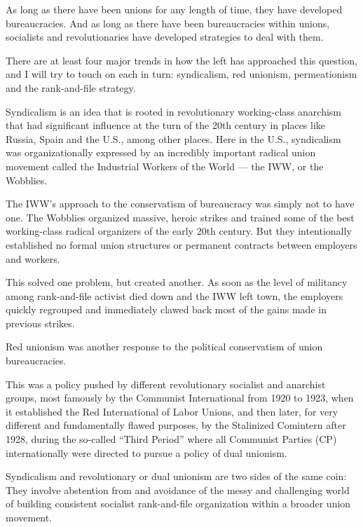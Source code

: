 \sectiondivider

As long as there have been unions for any length of time, they have developed bureaucracies. And as long as there have been bureaucracies within unions, socialists and revolutionaries have developed strategies to deal with them.

There are at least four major trends in how the left has approached this question, and I will try to touch on each in turn: syndicalism, red unionism, permeationism and the rank-and-file strategy.

Syndicalism is an idea that is rooted in revolutionary working-class anarchism that had significant influence at the turn of the 20th century in places like Russia, Spain and the U.S., among other places. Here in the U.S., syndicalism was organizationally expressed by an incredibly important radical union movement called the Industrial Workers of the World — the IWW, or the Wobblies.

The IWW’s approach to the conservatism of bureaucracy was simply not to have one. The Wobblies organized massive, heroic strikes and trained some of the best working-class radical organizers of the early 20th century. But they intentionally established no formal union structures or permanent contracts between employers and workers.

This solved one problem, but created another. As soon as the level of militancy among rank-and-file activist died down and the IWW left town, the employers quickly regrouped and immediately clawed back most of the gains made in previous strikes.

Red unionism was another response to the political conservatism of union bureaucracies.

This was a policy pushed by different revolutionary socialist and anarchist groups, most famously by the Communist International from 1920 to 1923, when it established the Red International of Labor Unions, and then later, for very different and fundamentally flawed purposes, by the Stalinized Comintern after 1928, during the so-called “Third Period” where all Communist Parties (CP) internationally were directed to pursue a policy of dual unionism.

Syndicalism and revolutionary or dual unionism are two sides of the same coin: They involve abstention from and avoidance of the messy and challenging world of building consistent socialist rank-and-file organization within a broader union movement.

\sectiondivider

